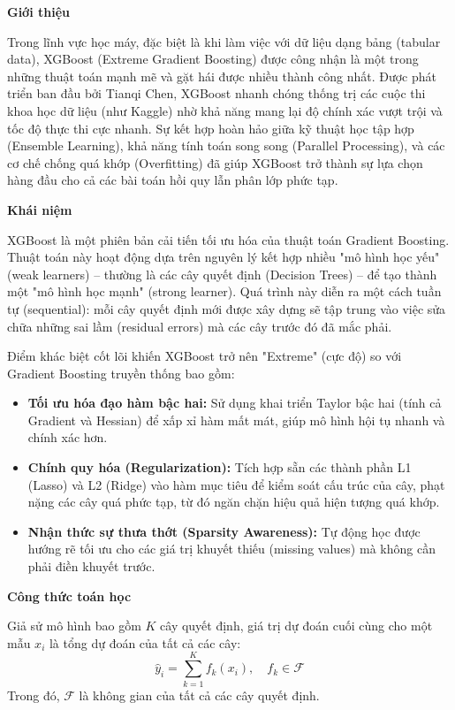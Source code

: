 \textbf{\large G}\textbf{iới thiệu}

Trong lĩnh vực học máy, đặc biệt là khi làm việc với dữ liệu dạng bảng (tabular data), XGBoost (Extreme Gradient Boosting) được công nhận là một trong những thuật toán mạnh mẽ và gặt hái được nhiều thành công nhất. Được phát triển ban đầu bởi Tianqi Chen, XGBoost nhanh chóng thống trị các cuộc thi khoa học dữ liệu (như Kaggle) nhờ khả năng mang lại độ chính xác vượt trội và tốc độ thực thi cực nhanh. Sự kết hợp hoàn hảo giữa kỹ thuật học tập hợp (Ensemble Learning), khả năng tính toán song song (Parallel Processing), và các cơ chế chống quá khớp (Overfitting) đã giúp XGBoost trở thành sự lựa chọn hàng đầu cho cả các bài toán hồi quy lẫn phân lớp phức tạp.

\textbf{\large K}\textbf{hái niệm}

XGBoost là một phiên bản cải tiến tối ưu hóa của thuật toán Gradient Boosting. Thuật toán này hoạt động dựa trên nguyên lý kết hợp nhiều "mô hình học yếu" (weak learners) – thường là các cây quyết định (Decision Trees) – để tạo thành một "mô hình học mạnh" (strong learner). Quá trình này diễn ra một cách tuần tự (sequential): mỗi cây quyết định mới được xây dựng sẽ tập trung vào việc sửa chữa những sai lầm (residual errors) mà các cây trước đó đã mắc phải.

Điểm khác biệt cốt lõi khiến XGBoost trở nên "Extreme" (cực độ) so với Gradient Boosting truyền thống bao gồm:
\begin{itemize}
    \item \textbf{Tối ưu hóa đạo hàm bậc hai:} Sử dụng khai triển Taylor bậc hai (tính cả Gradient và Hessian) để xấp xỉ hàm mất mát, giúp mô hình hội tụ nhanh và chính xác hơn.
    \item \textbf{Chính quy hóa (Regularization):} Tích hợp sẵn các thành phần L1 (Lasso) và L2 (Ridge) vào hàm mục tiêu để kiểm soát cấu trúc của cây, phạt nặng các cây quá phức tạp, từ đó ngăn chặn hiệu quả hiện tượng quá khớp.
    \item \textbf{Nhận thức sự thưa thớt (Sparsity Awareness):} Tự động học được hướng rẽ tối ưu cho các giá trị khuyết thiếu (missing values) mà không cần phải điền khuyết trước.
\end{itemize}


\textbf{\large C}\textbf{ông thức toán học}

Giả sử mô hình bao gồm $K$ cây quyết định, giá trị dự đoán cuối cùng cho một mẫu $x_i$ là tổng dự đoán của tất cả các cây:
\begin{equation}
\hat{y}_i = \sum_{k=1}^{K} f_k(x_i), \quad f_k \in \mathcal{F}
\end{equation}
Trong đó, $\mathcal{F}$ là không gian của tất cả các cây quyết định.

